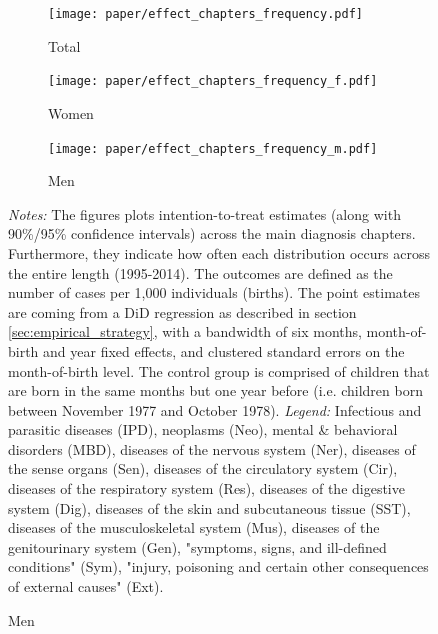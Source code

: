 \documentclass[11pt, a4paper]{article} %
\begin{document}
\begin{landscape}
	\vspace*{\fill}
	\begin{figure}[H]\centering
		\caption{Intention-to-treat effects across main chapters}\label{fig: lc_hospital2_gdr_DD}
		\begin{subfigure}[h]{0.31\linewidth}\centering\caption{Total}
			\texttt{[image: paper/effect\_chapters\_frequency.pdf]}
		\end{subfigure}
		\begin{subfigure}[h]{0.31\linewidth}\centering\caption{Women}
			\texttt{[image: paper/effect\_chapters\_frequency\_f.pdf]}
		\end{subfigure}
		\begin{subfigure}[h]{0.31\linewidth}\centering\caption{Men}
			\texttt{[image: paper/effect\_chapters\_frequency\_m.pdf]}
		\end{subfigure}
		\scriptsize
		\begin{minipage}{\linewidth}
			\emph{Notes:} The figures plots intention-to-treat estimates (along with 90\%/95\% confidence intervals) across the main diagnosis chapters. Furthermore, they indicate how often each distribution occurs across the entire length (1995-2014). The outcomes are defined as the number of cases per 1,000 individuals (births). The point estimates are coming from a DiD regression as described in section \ref{sec:empirical_strategy}, with a bandwidth of six months, month-of-birth and year fixed effects, and clustered standard errors on the month-of-birth level. The control group is comprised of children	that are born in the same months but one year before (i.e. children born between November 1977 and October 1978). \newline
			\emph{Legend:} Infectious and parasitic diseases (IPD), neoplasms (Neo), mental \& behavioral disorders (MBD), diseases of the nervous system (Ner), diseases of the sense organs (Sen), diseases of the circulatory system (Cir), diseases of the respiratory system (Res), diseases of the digestive system (Dig), diseases of the skin and subcutaneous tissue (SST), diseases of the musculoskeletal system (Mus), diseases of the genitourinary system (Gen), "symptoms, signs, and ill-defined conditions" (Sym), "injury, poisoning and certain other consequences of external causes" (Ext).
			
		\end{minipage}
	\end{figure}
	\vspace*{\fill}\clearpage
\end{landscape}
\end{document}
